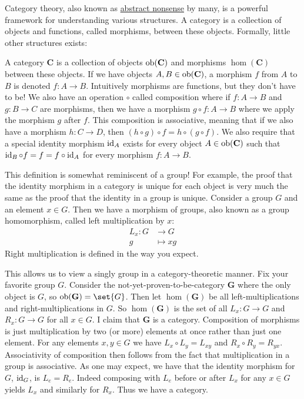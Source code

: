 \documentclass{article}
\begin{document}
Category theory, also known as \href{https://en.wikipedia.org/wiki/Abstract_nonsense\#History}{abstract nonsense} by many, is a powerful framework for understanding various structures.
A category is a collection of objects and functions, called morphisms, between these objects.
Formally, little other structures exists:
\begin{defn}\label{defn:cat}
  A category $\textbf{C}$ is a collection of objects $\operatorname{ob}(\textbf{C})$ and morphisms $\hom(\textbf{C})$ between these objects.
  If we have objects $A, B \in \operatorname{ob}(\textbf{C})$, a morphism $f$ from $A$ to $B$ is denoted $f\colon A \to B$.
  Intuitively morphisms are functions, but they don't have to be!
  We also have an operation $\circ$ called composition where if $f\colon A \to B$ and $g\colon B \to C$ are morphisms, then we have a morphism $g \circ f\colon A \to B$ where we apply the morphism $g$ after $f$.
  This composition is associative, meaning that if we also have a morphism $h\colon C \to D$, then $(h \circ g) \circ f = h \circ (g \circ f)$.
  We also require that a special identity morphism $\operatorname{id}_{A}$ exists for every object $A \in \operatorname{ob}(\textbf{C})$ such that $\operatorname{id}_{B} \circ f = f = f \circ \operatorname{id}_{A}$ for every morphism $f\colon A \to B$.
\end{defn}

This definition is somewhat reminiscent of a group!
For example, the proof that the identity morphism in a category is unique for each object is very much the same as the proof that the identity in a group is unique.
Consider a group $G$ and an element $x \in G$.
Then we have a morphism of groups, also known as a group homomorphism, called left multiplication by $x$:
\begin{align*}
  L_{x}\colon G &\to G \\
              g &\mapsto xg
\end{align*}
Right multiplication is defined in the way you expect.

This allows us to view a singly group in a category-theoretic manner.
Fix your favorite group $G$.
Consider the not-yet-proven-to-be-category $\textbf{G}$ where the only object is $G$, so $\ob(\textbf{G}) = \set{G}$.
Then let $\hom(\textbf{G})$ be all left-multiplications and right-multiplications in $G$.
So $\hom(\textbf{G})$ is the set of all $L_{x}\colon G \to G$ and $R_{x}\colon G \to G$ for all $x \in G$.
I claim that $\textbf{G}$ is a category.
Composition of morphisms is just multiplication by two (or more) elements at once rather than just one element.
For any elements $x, y \in G$ we have $L_{x} \circ L_{y} = L_{xy}$ and $R_{x} \circ R_{y} = R_{yx}$.
Associativity of composition then follows from the fact that multiplication in a group is associative.
As one may expect, we have that the identity morphism for $G$, $\operatorname{id}_{G}$, is $L_{e} = R_{e}$.
Indeed composing with $L_{e}$ before or after $L_{x}$ for any $x \in G$ yields $L_{x}$ and similarly for $R_{x}$.
Thus we have a category.
\end{document}
